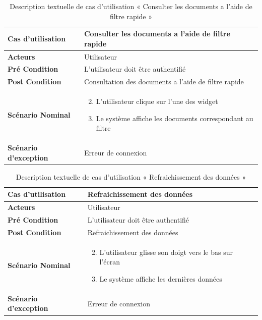 \begin{longtable}{|p{5cm}|p{10cm}|}
  \caption{Description textuelle de cas d'utilisation « Consulter les documents a l'aide de filtre rapide »} \label{tab:use_case_consulter_documents_filtre_rapide} \\
\hline
\textbf{Cas d'utilisation}&Consulter les documents a l'aide de filtre rapide\\
\hline
\textbf{Acteurs}&Utilisateur \\
\hline
\textbf{Pré Condition}&L'utilisateur doit être authentifié\\
\hline
\textbf{Post Condition}&Consultation des documents a l'aide de filtre rapide\\
\hline
\textbf{Scénario Nominal}&
\vspace{-\baselineskip}
\begin{enumerate}
    \setcounter{enumi}{1}
      \item L'utilisateur clique sur l'une des widget
      \item Le système affiche les documents correspondant au filtre
\end{enumerate}\\
\hline
\textbf{Scénario d'exception}&Erreur de connexion\\
\hline

\end{longtable}




\begin{longtable}{|p{5cm}|p{10cm}|}
  \caption{Description textuelle de cas d'utilisation « Refraichissement des données »} \label{tab:use_case_refraichissement_donnees} \\
\hline
\textbf{Cas d'utilisation}&Refraichissement des données\\
\hline
\textbf{Acteurs}&Utilisateur \\
\hline
\textbf{Pré Condition}&L'utilisateur doit être authentifié\\
\hline
\textbf{Post Condition}&Refraichissement des données\\
\hline
\textbf{Scénario Nominal}&
\vspace{-\baselineskip}
\begin{enumerate}
    \setcounter{enumi}{1}
      \item L'utilisateur glisse son doigt vers le bas sur l'écran
      \item Le système affiche les dernières données
\end{enumerate}\\
\hline
\textbf{Scénario d'exception}&Erreur de connexion\\
\hline

\end{longtable}

